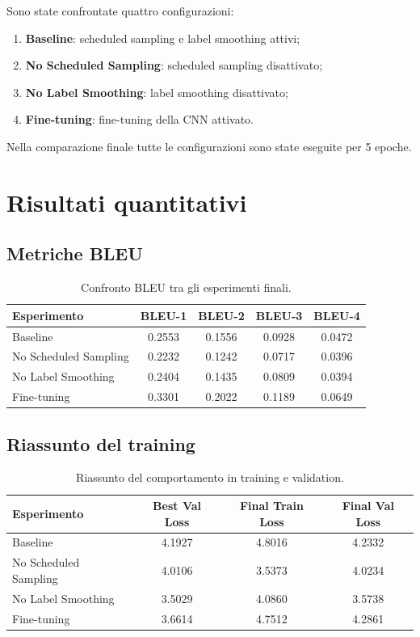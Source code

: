 \documentclass[12pt,a4paper]{article}
\begin{document}
Sono state confrontate quattro configurazioni:
\begin{enumerate}[leftmargin=*]
    \item \textbf{Baseline}: scheduled sampling e label smoothing attivi;
    \item \textbf{No Scheduled Sampling}: scheduled sampling disattivato;
    \item \textbf{No Label Smoothing}: label smoothing disattivato;
    \item \textbf{Fine-tuning}: fine-tuning della CNN attivato.
\end{enumerate}

Nella comparazione finale tutte le configurazioni sono state eseguite per 5 epoche.

\section{Risultati quantitativi}

\subsection{Metriche BLEU}

\begin{table}[H]
\centering
\caption{Confronto BLEU tra gli esperimenti finali.}
\begin{tabular}{lcccc}
\toprule
Esperimento & BLEU-1 & BLEU-2 & BLEU-3 & BLEU-4 \\
\midrule
Baseline & 0.2553 & 0.1556 & 0.0928 & 0.0472 \\
No Scheduled Sampling & 0.2232 & 0.1242 & 0.0717 & 0.0396 \\
No Label Smoothing & 0.2404 & 0.1435 & 0.0809 & 0.0394 \\
Fine-tuning & 0.3301 & 0.2022 & 0.1189 & 0.0649 \\
\bottomrule
\end{tabular}
\end{table}

\subsection{Riassunto del training}

\begin{table}[H]
\centering
\caption{Riassunto del comportamento in training e validation.}
\begin{tabular}{lccc}
\toprule
Esperimento & Best Val Loss & Final Train Loss & Final Val Loss \\
\midrule
Baseline & 4.1927 & 4.8016 & 4.2332 \\
No Scheduled Sampling & 4.0106 & 3.5373 & 4.0234 \\
No Label Smoothing & 3.5029 & 4.0860 & 3.5738 \\
Fine-tuning & 3.6614 & 4.7512 & 4.2861 \\
\bottomrule
\end{tabular}
\end{table}
\end{document}
